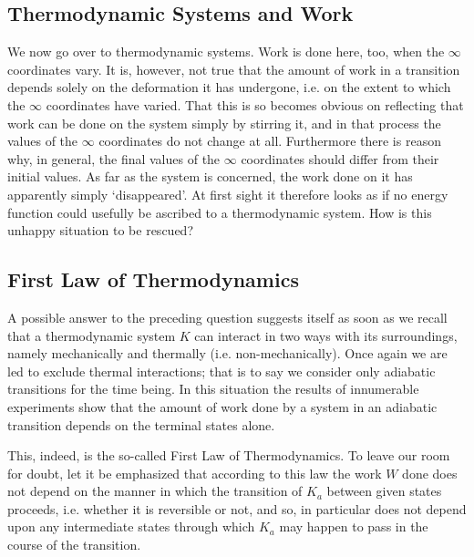 \documentclass{article}
\theoremstyle{definition}
\begin{document}
\subsection{Thermodynamic Systems and Work}
We now go over to thermodynamic systems. Work is done here, too, when the \(\infty\) coordinates vary. It is, however, not true that the amount of work in a transition depends solely on the deformation it has undergone, i.e. on the extent to which the \(\infty\) coordinates have varied. That this is so becomes obvious on reflecting that work can be done on the system simply by stirring it, and in that process the values of the \(\infty\) coordinates do not change at all. Furthermore there is reason why, in general, the final values of the \(\infty\) coordinates should differ from their initial values. As far as the system is concerned, the work done on it has apparently simply ‘disappeared’. At first sight it therefore looks as if no energy function could usefully be ascribed to a thermodynamic system. How is this unhappy situation to be rescued?

\subsection{First Law of Thermodynamics}
A possible answer to the preceding question suggests itself as soon as we recall that a thermodynamic system \(K\) can interact in two ways with its surroundings, namely mechanically and thermally (i.e. non-mechanically). Once again we are led to exclude thermal interactions; that is to say we consider only adiabatic transitions for the time being. In this situation the results of innumerable experiments show that the amount of work done by a system in an adiabatic transition depends on the terminal states alone.

This, indeed, is the so-called First Law of Thermodynamics. To leave our room for doubt, let it be emphasized that according to this law the work \(W\) done does not depend on the manner in which the transition of \(K_a\) between given states proceeds, i.e. whether it is reversible or not, and so, in particular does not depend upon any intermediate states through which \(K_a\) may happen to pass in the course of the transition.
\end{document}
